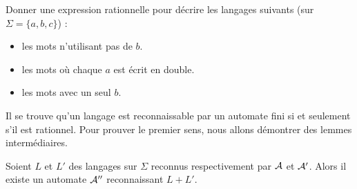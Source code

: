  \begin{exo}
     Donner une expression rationnelle pour décrire les langages suivants (sur $\Sigma = \{a,b,c\}$) :
     \begin{itemize}[label=$\bullet$]
         \item les mots n'utilisant pas de $b$.
         \item les mots où chaque $a$ est écrit en double.
         \item les mots avec un seul $b$.
     \end{itemize}
 \end{exo}

 Il se trouve qu'un langage est reconnaissable par un automate fini si et seulement s'il est rationnel. Pour prouver le premier sens, nous allons démontrer des lemmes intermédiaires.

 \begin{lem}\label{lem:union}
    Soient $L$ et $L'$ des langages sur $\Sigma$ reconnus respectivement par $\mathcal A$ et $\mathcal A'$. Alors il existe un automate $\mathcal A''$ reconnaissant $L+L'$.
 \end{lem}

